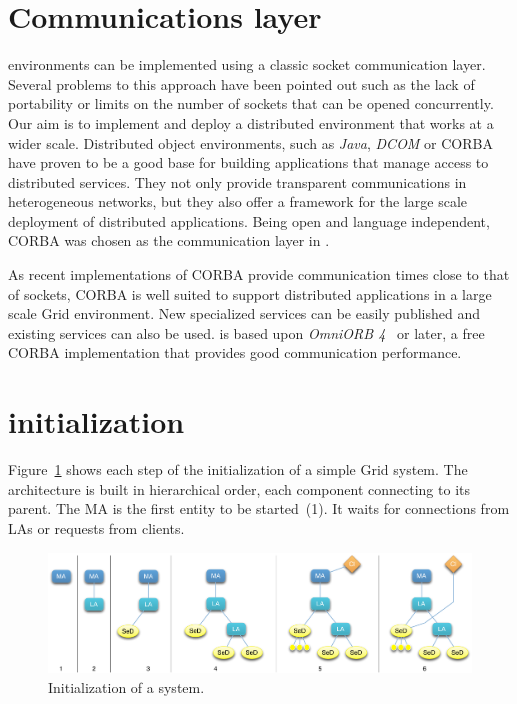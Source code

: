 \section{Communications layer}
\label{sec:CORBA}

\nes environments can be implemented using a classic socket communication
layer. Several problems to this approach have been pointed out such as the lack
of portability or limits on the number of sockets that can be opened
concurrently. Our aim is to implement and deploy a distributed \nes environment
that works at a wider scale. Distributed object environments, such as
\emph{Java}, \emph{DCOM} or CORBA have proven to be a good base for building
applications that manage access to distributed services. They not only provide
transparent communications in heterogeneous networks, but they also offer a
framework for the large scale deployment of distributed applications. Being
open and language independent, CORBA was chosen as the communication layer in
\diet.

As recent implementations of CORBA provide communication times close
to that of sockets, CORBA is well suited to support distributed
applications in a large scale Grid environment. New specialized
services can be easily published and existing services can also be
used.  \diet is based upon \emph{OmniORB 4}~\cite{OMNIORB} or later, a
free CORBA implementation that provides good communication
performance.



\section{\diet initialization}
\label{init}

Figure~\ref{fig:init} shows each step of the initialization of a simple Grid
system. The architecture is built in hierarchical order, each component
connecting to its parent. The MA is the first entity to be started~(1). It
waits for connections from LAs or requests from clients.

\begin{figure}[hbt]
  \begin{center}
    \includegraphics[scale=.6]{fig/init}
    \caption{Initialization of a \diet system.}
    \label{fig:init}
  \end{center}
\end{figure}

